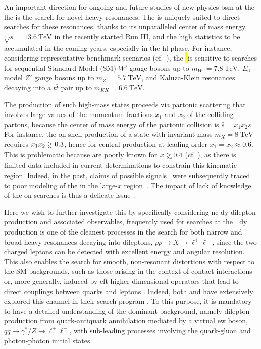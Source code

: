 
An important direction for ongoing and future studies of  new physics
\acrfull{bsm} at the \acrfull{lhc} is the search for novel heavy resonances.
%
The \lhc is uniquely suited to direct searches for these resonances, thanks to
its unparalleled center of mass energy,
$\sqrt{s}=\SI{13.6}{\tera\electronvolt}$ in the recently started  Run III, and
the high statistics to be accumulated in the coming years, especially in the
\acrfull{hl} phase.
%
For instance, considering representative benchmark \bsm scenarios (cf.\
\cite{CidVidal:2018eel}), the \hl-\lhc is sensitive to  searches for sequential
Standard Model (SM)  $W'$ gauge bosons  up to
$m_{W'}=\SI{7.8}{\tera\electronvolt}$, $E_6$ model $Z'$ gauge bosons up to
$m_{Z'}=\SI{5.7}{\tera\electronvolt}$, and Kaluza-Klein resonances decaying
into a $t\bar{t}$ pair up to $m_{KK}=\SI{6.6}{\tera\electronvolt}$.

The production of such high-mass states proceeds via partonic scattering that
involves large  values of the momentum fractions $x_1$ and $x_2$ of the
colliding partons, because the center of mass energy of the partonic collision
is $\hat s= x_1 x_2 s$.
%
For instance, the on-shell production of a state with invariant mass
$m_{X}=\SI{8}{\tera\electronvolt}$ requires $x_1x_2 \gsim 0.3$, hence for
central production at leading order $x_1=x_2\approx 0.6$. 
This is problematic because \pdfs are poorly known for $x\gsim 0.4$ (cf.
\cite{Gao:2017yyd,Kovarik:2019xvh}), as there is limited data included in
current \pdf determinations to constrain this kinematic region.
%
Indeed, in the past, claims of possible \bsm signals~\cite{CDF:1996yow} 
were subsequently traced to poor modeling of the \pdfs in the large-$x$
region~\cite{Lai:1996mg}.
%
The impact of lack of knowledge of the \pdfs
on \bsm searches is thus a delicate issue~\cite{Beenakker:2015rna}.

Here we wish to further investigate this by specifically considering
\acrfull{nc} \acrfull{dy} dilepton production and associated observables,
frequently  used for \bsm searches at the \lhc.
%
\nc \acrlong{dy} production is one of the cleanest processes in the search for 
both narrow and broad heavy resonances decaying into dileptons, $pp \to X \to
\ell^+\ell^-$, since  the two charged leptons can be detected with excellent
energy and angular resolution.
%
This also enables the search for smooth, non-resonant distortions with respect
to the SM backgrounds, such as those arising in the context of contact
interactions  or, more generally, induced by \acrfull{eft} higher-dimensional
operators that lead to  direct couplings between quarks and
leptons \cite{Ethier:2021bye,Dawson:2018dxp,Ellis:2020unq,Greljo:2021kvv}.
Indeed, both \atlas and \cms have extensively explored this channel in their
\bsm search program
\cite{ATLAS:2014gys,ATLAS:2020yat,ATLAS:2019erb,CMS:2021ctt,ATLAS:2021mla,CMS:2018nlk}.
To this purpose, it is mandatory to have a detailed understanding of the
dominant \sm background, namely dilepton production from quark-antiquark
annihilation mediated by a virtual \acrfull{ew} boson, $q\bar{q} \to 
\gamma^*/Z \to \ell^+\ell^-$, with sub-leading processes involving the
quark-gluon and photon-photon initial states.

